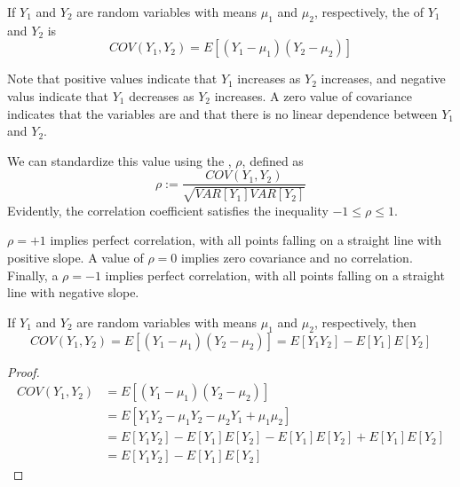 \documentclass[12pt, a4paper, twoside, openright, titlepage]{book}
\begin{document}
\begin{defn}{}{}
    If $Y_1$ and $Y_2$ are random variables with means $\mu_1$ and $\mu_2$, respectively, the  of $Y_1$ and $Y_2$ is \begin{equation*}
        COV(Y_1,Y_2) = E[(Y_1-\mu_1)(Y_2-\mu_2)]
    \end{equation*}
\end{defn}

Note that positive values indicate that $Y_1$ increases as $Y_2$ increases, and negative valus indicate that $Y_1$ decreases as $Y_2$ increases. A zero value of covariance indicates that the variables are  and that there is no linear dependence between $Y_1$ and $Y_2$.

\begin{defn}{}{}
    We can standardize this value using the , $\rho$, defined as \begin{equation*}
        \rho := \frac{COV(Y_1,Y_2)}{\sqrt{VAR[Y_1]VAR[Y_2]}}
    \end{equation*}
    Evidently, the correlation coefficient satisfies the inequality $-1 \leq \rho \leq 1$.
\end{defn}

$\rho = +1$ implies perfect correlation, with all points falling on a straight line with positive slope. A value of $\rho = 0$ implies zero covariance and no correlation. Finally, a $\rho = -1$ implies perfect correlation, with all points falling on a straight line with negative slope.

\begin{thm}{}{}
    If $Y_1$ and $Y_2$ are random variables with means $\mu_1$ and $\mu_2$, respectively, then \begin{equation*}
        COV(Y_1,Y_2) = E[(Y_1-\mu_1)(Y_2-\mu_2)] = E[Y_1Y_2] - E[Y_1]E[Y_2]
    \end{equation*}
\end{thm}
\begin{proof}{}{}
    \begin{align*}
        COV(Y_1,Y_2) &= E[(Y_1-\mu_1)(Y_2-\mu_2)] \\
        &= E[Y_1Y_2-\mu_1Y_2-\mu_2Y_1+\mu_1\mu_2] \\
        &= E[Y_1Y_2] - E[Y_1]E[Y_2] - E[Y_1]E[Y_2] + E[Y_1]E[Y_2] \\
        &= E[Y_1Y_2] - E[Y_1]E[Y_2]
    \end{align*}
\end{proof}
\end{document}
